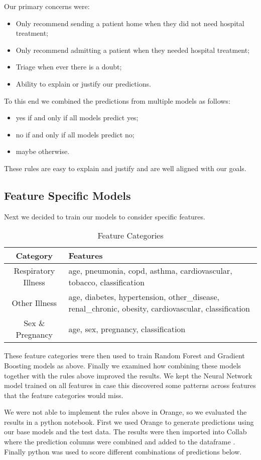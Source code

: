 Our primary concerns were:
\begin{itemize}
    \item Only recommend sending a patient home when they did not need hospital treatment;
    \item Only recommend admitting a patient when they needed hospital treatment;
    \item Triage when ever there is a doubt;
    \item Ability to explain or justify our predictions.
\end{itemize}

To this end we combined the predictions from multiple models as follows:

\begin{itemize}
    \item yes if and only if all models predict yes;
    \item no if and only if all models predict no;
    \item maybe otherwise.
\end{itemize}

These rules are easy to explain and justify and are well aligned with our goals.

\subsection{Feature Specific Models}

Next we decided to train our models to consider specific features.

\begin{table}[H]
    \centering
    \caption{Feature Categories}
    \label{tab:feat_spec_models}
    \begin{tabular}{cp{11cm}} \hline 
     \textbf{Category} & \textbf{Features} \\ \hline\hline
      Respiratory Illness &  age,  pneumonia, copd, asthma, cardiovascular, tobacco, classification\\ 
      Other Illness &  age, diabetes, hypertension, other\_disease, renal\_chronic, obesity, cardiovascular, classification \\ 
      Sex \& Pregnancy  &  age, sex, pregnancy, classification \\ \hline 
    \end{tabular}
\end{table}

These feature categories were then used to train Random Forest and Gradient Boosting models as above. 
Finally we examined how combining these models together with the rules above improved the results. We
kept the Neural Network model trained on all features in case this discovered some patterns across features
that the feature categories would miss.

We were not able to implement the rules above in Orange, so we evaluated the results in a python notebook.
First we used Orange to generate predictions using our base models and the test data. The results
were then imported into Collab where the prediction columns were combined and added to the dataframe
. Finally python was used to score different combinations of predictions below.



